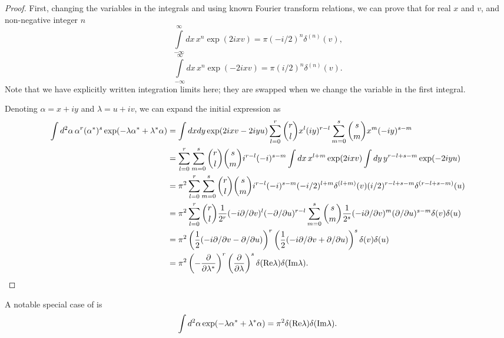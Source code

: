 \begin{proof}
First, changing the variables in the integrals and using known Fourier transform relations, we can prove that for real $x$ and $v$, and non-negative integer $n$
\[
	\int\limits_{-\infty}^{\infty} dx\, x^n \exp(2 i x v) = \pi (-i / 2)^n \delta^{(n)}(v),
\]
\[
	\int\limits_{-\infty}^{\infty} dx\, x^n \exp(-2 i x v) = \pi (i / 2)^n \delta^{(n)}(v).
\]
Note that we have explicitly written integration limits here;
they are swapped when we change the variable in the first integral.

Denoting $\alpha = x + iy$ and $\lambda = u + iv$, we can expand the initial expression as
\begin{equation*}
\begin{split}
	\int d^2\alpha\, \alpha^r (\alpha^*)^s \exp(-\lambda \alpha^* + \lambda^* \alpha)
	& = \int dx dy \exp(2ixv - 2iyu)
		\sum\limits_{l=0}^r \binom{r}{l} x^l (iy)^{r-l}
		\sum\limits_{m=0}^s \binom{s}{m} x^m (-iy)^{s-m} \\
	& = \sum\limits_{l=0}^r \sum\limits_{m=0}^s \binom{r}{l} \binom{s}{m}
		i^{r-l} (-i)^{s-m}
		\int dx\, x^{l+m} \exp(2ixv)
		\int dy\, y^{r-l+s-m} \exp(-2iyu) \\
	& = \pi^2 \sum\limits_{l=0}^r \sum\limits_{m=0}^s \binom{r}{l} \binom{s}{m}
		i^{r-l} (-i)^{s-m}
		(-i/2)^{l+m} \delta^{(l+m)}(v)
		(i/2)^{r-l+s-m} \delta^{(r-l+s-m)}(u) \\
	& = \pi^2
		\sum\limits_{l=0}^r \binom{r}{l}
			\frac{1}{2^r}
			(-i \partial / \partial v)^l
			(-\partial / \partial u)^{r-l}
		\sum\limits_{m=0}^s \binom{s}{m}
			\frac{1}{2^s}
			(-i \partial / \partial v)^m
			(\partial / \partial u)^{s-m}
		\delta(v) \delta(u) \\
	& = \pi^2
		\left( \frac{1}{2} (-i \partial / \partial v - \partial / \partial u) \right)^r
		\left( \frac{1}{2} (-i \partial / \partial v + \partial / \partial u) \right)^s
		\delta(v) \delta(u) \\
	& = \pi^2
		\left( -\frac{\partial}{\partial \lambda^*} \right)^r
		\left( \frac{\partial}{\partial \lambda} \right)^s
		\delta(\mathrm{Re} \lambda) \delta(\mathrm{Im} \lambda).
		\qedhere
\end{split}
\end{equation*}
\end{proof}

A notable special case of  is
\[
	\int d^2\alpha \exp(-\lambda \alpha^* + \lambda^* \alpha)
	= \pi^2 \delta(\mathrm{Re} \lambda) \delta(\mathrm{Im} \lambda).
\]

